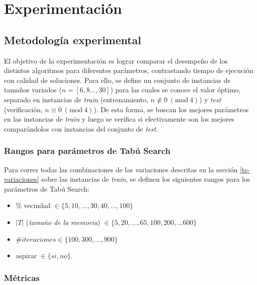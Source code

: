 \section{Experimentación}


\subsection{Metodología experimental}\label{section:metodologia-experimental}

El objetivo de la experimentación es lograr comparar el desempeño de los distintos algoritmos para diferentes parámetros, contrastando tiempo de ejecución con calidad de soluciones. Para ello, se define un conjunto de instancias de tamaños variados ($n = [6, 8..., 30]$) para las cuales se conoce el valor óptimo, separado en instancias de \textit{train} (entrenamiento, $n \not\equiv 0\ (\text{mod}\ 4)$) y \textit{test} (verificación, $n \equiv 0\ (\text{mod}\ 4)$). De esta forma, se buscan los mejores parámetros en las instancias de \textit{train} y luego se verifica si efectivamente son los mejores comparándolos con instancias del conjunto de \textit{test}.

\subsubsection{Rangos para parámetros de Tabú Search}

Para correr todas las combinaciones de las variaciones descritas en la sección \ref{ts-variaciones} sobre las instancias de \textit{train}, se definen los siguientes rangos para los parámetros de Tabú Search:

\begin{itemize}
    \item \% vecindad $\in \{5, 10, \dots, 30, 40, \dots, 100\}$
    \item $|T|$ (\textit{tamaño de la memoria}) $\in \{5, 20, \dots, 65, 100, 200, \dots 600\}$
    \item $\#iteraciones \in \{100, 300, \dots, 900\}$
    \item aspirar $\in \{si, no\}$.
\end{itemize}

\subsubsection{Métricas}

